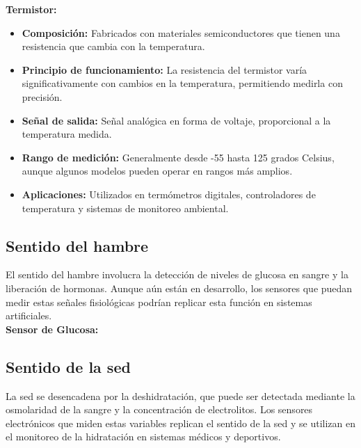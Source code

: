 \documentclass[conference]{IEEEtran}
\begin{document}
\textbf{Termistor:}
\begin{itemize}
    \item \textbf{Composición:} Fabricados con materiales semiconductores que tienen una resistencia que cambia con la temperatura.
    \item \textbf{Principio de funcionamiento:} La resistencia del termistor varía significativamente con cambios en la temperatura, permitiendo medirla con precisión.
    \item \textbf{Señal de salida:} Señal analógica en forma de voltaje, proporcional a la temperatura medida.
    \item \textbf{Rango de medición:} Generalmente desde -55 hasta 125 grados Celsius, aunque algunos modelos pueden operar en rangos más amplios.
    \item \textbf{Aplicaciones:} Utilizados en termómetros digitales, controladores de temperatura y sistemas de monitoreo ambiental.
\end{itemize}


\subsection{Sentido del hambre}

El sentido del hambre involucra la detección de niveles de glucosa en sangre y la liberación de hormonas. Aunque aún están en desarrollo, los sensores que puedan medir estas señales fisiológicas podrían replicar esta función en sistemas artificiales.\\

\textbf{Sensor de Glucosa:}

\subsection{Sentido de la sed}

La sed se desencadena por la deshidratación, que puede ser detectada mediante la osmolaridad de la sangre y la concentración de electrolitos. Los sensores electrónicos que miden estas variables replican el sentido de la sed y se utilizan en el monitoreo de la hidratación en sistemas médicos y deportivos.\\
\end{document}
